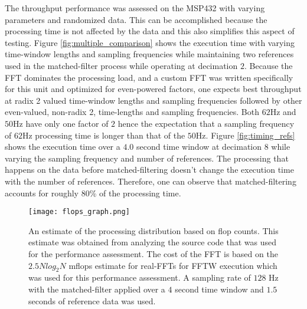 \documentclass{sciposter}
\begin{document}
\begin{multicols}{3}
%
The throughput performance was assessed on the MSP432 with varying parameters and randomized data.
This can be accomplished because the processing time is not affected by the data and this also simplifies this aspect of testing.
Figure \ref{fig:multiple_comparison} shows the execution time with varying time-window lengths and sampling frequencies while maintaining two references used in the matched-filter process while operating at decimation $2$.
Because the FFT dominates the processing load, and a custom FFT was written specifically for this unit and optimized for even-powered factors, one expects best throughput at radix 2 valued time-window lengths and sampling frequencies followed by other even-valued, non-radix 2, time-lengths and sampling frequencies. Both $62$Hz and $50$Hz have only one factor of $2$ hence the expectation that a sampling frequency of $62$Hz processing time is longer than that of the $50$Hz.
Figure \ref{fig:timing_refs} shows the execution time over a $4.0$ second time window at decimation $8$ while varying the sampling frequency and number of references.
The processing that happens on the data before matched-filtering doesn't change the execution time with the number of references.
Therefore, one can observe that matched-filtering accounts for roughly $80$\% of the processing time.
%
\begin{figure}[!ht]
   \centering
   \texttt{[image: flops\_graph.png]}
   \caption{An estimate of the processing distribution based on flop counts. This estimate was obtained from analyzing the source code that was used for the performance assessment. The cost of the FFT is based on the $2.5 N log_2 N$ mflops estimate for real-FFTs for FFTW \cite{FFTW} execution which was used for this performance assessment. A sampling rate of $128$ Hz with the matched-filter applied over a $4$ second time window and $1.5$ seconds of reference data was used.}
   \label{fig:flops_count}
\end{figure}


\end{multicols}
\end{document}
